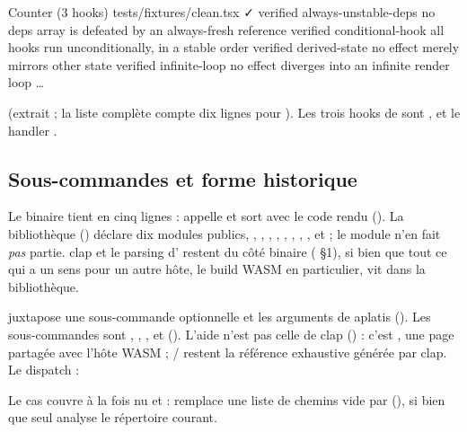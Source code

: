 \begin{sortie}
  Counter  (3 hooks)  tests/fixtures/clean.tsx  ✓
    verified  always-unstable-deps  no deps array is defeated by an always-fresh reference
    verified  conditional-hook  all hooks run unconditionally, in a stable order
    verified  derived-state  no effect merely mirrors other state
    verified  infinite-loop  no effect diverges into an infinite render loop
    …
\end{sortie}

\noindent(extrait ; la liste complète compte dix lignes pour ). Les trois hooks de  sont ,  et le handler .

\subsection{Sous-commandes et forme historique}

Le binaire tient en cinq lignes :  appelle  et sort avec le code rendu (). La bibliothèque () déclare dix modules publics, , , , , , , , ,  et  ; le module  n'en fait \emph{pas} partie. clap et le parsing d' restent du côté binaire ( §1), si bien que tout ce qui a un sens pour un autre hôte, le build WASM en particulier, vit dans la bibliothèque.


 juxtapose une sous-commande optionnelle et les arguments de  aplatis (). Les sous-commandes sont , , ,  et  (). L'aide  n'est pas celle de clap () : c'est , une page partagée avec l'hôte WASM ; / restent la référence exhaustive générée par clap. Le dispatch :


Le cas  couvre à la fois  nu et  :  remplace une liste de chemins vide par  (), si bien que  seul analyse le répertoire courant.

